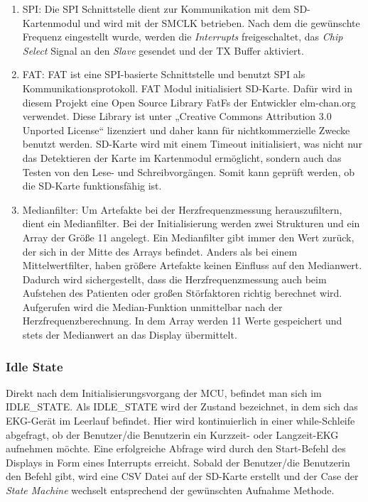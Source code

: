 \begin{enumerate}
    \item SPI: Die SPI Schnittstelle dient zur Kommunikation mit dem SD-Kartenmodul und wird mit der SMCLK betrieben. Nach dem die gewünschte Frequenz eingestellt wurde, werden die \textit{Interrupts} freigeschaltet, das \textit{Chip Select} Signal an den \textit{Slave} gesendet und der TX Buffer aktiviert.
    \item FAT: FAT ist eine SPI-basierte Schnittstelle und benutzt SPI als Kommunikationsprotokoll. FAT Modul initialisiert SD-Karte. Dafür wird in diesem Projekt eine Open Source Library FatFs der Entwickler elm-chan.org verwendet. Diese Library ist unter „Creative Commons Attribution 3.0 Unported License“ lizenziert und daher kann für nichtkommerzielle Zwecke benutzt werden. 
    SD-Karte wird mit einem Timeout initialisiert, was nicht nur das Detektieren der Karte im Kartenmodul ermöglicht, sondern auch das Testen von den Lese- und Schreibvorgängen. Somit kann geprüft werden, ob die SD-Karte funktionsfähig ist.
    \item Medianfilter: Um Artefakte bei der Herzfrequenzmessung herauszufiltern, dient ein Medianfilter. Bei der Initialisierung werden zwei Strukturen und ein Array der Größe 11 angelegt. Ein Medianfilter gibt immer den Wert zurück, der sich in der Mitte des Arrays befindet. Anders als bei einem Mittelwertfilter, haben größere Artefakte keinen Einfluss auf den Medianwert. Dadurch wird sichergestellt, dass die Herzfrequenzmessung auch beim Aufstehen des Patienten oder großen Störfaktoren richtig berechnet wird. Aufgerufen wird die Median-Funktion unmittelbar nach der Herzfrequenzberechnung. In dem Array werden 11 Werte gespeichert und stets der Medianwert an das Display übermittelt.
\end{enumerate}

\subsubsection{Idle State}

Direkt nach dem Initialisierungsvorgang der MCU, befindet man sich im IDLE\_STATE. 
Als IDLE\_STATE wird der Zustand bezeichnet, in dem sich das EKG-Gerät im Leerlauf befindet. Hier wird kontinuierlich in einer while-Schleife abgefragt, ob der Benutzer/die Benutzerin ein Kurzzeit- oder Langzeit-EKG aufnehmen möchte.
Eine erfolgreiche Abfrage wird durch den Start-Befehl des Displays in Form eines Interrupts erreicht. Sobald der Benutzer/die Benutzerin den Befehl gibt, wird eine CSV Datei auf der SD-Karte erstellt und der Case der \textit{State Machine} wechselt entsprechend der gewünschten Aufnahme Methode.

